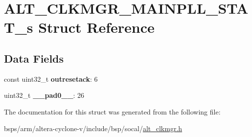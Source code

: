 \hypertarget{structALT__CLKMGR__MAINPLL__STAT__s}{}\section{A\+L\+T\+\_\+\+C\+L\+K\+M\+G\+R\+\_\+\+M\+A\+I\+N\+P\+L\+L\+\_\+\+S\+T\+A\+T\+\_\+s Struct Reference}
\label{structALT__CLKMGR__MAINPLL__STAT__s}
\subsection*{Data Fields}
\begin{DoxyCompactItemize}
\item 
\mbox{\label{structALT__CLKMGR__MAINPLL__STAT__s_a74b16db7f52521e12f6a29ea61d9e91f}} 
const uint32\+\_\+t {\bfseries outresetack}\+: 6
\item 
\mbox{\label{structALT__CLKMGR__MAINPLL__STAT__s_add95f56462ce6b303ce8cf787a5200f0}} 
uint32\+\_\+t {\bfseries \+\_\+\+\_\+pad0\+\_\+\+\_\+}\+: 26
\end{DoxyCompactItemize}


The documentation for this struct was generated from the following file\+:\begin{DoxyCompactItemize}
\item 
bsps/arm/altera-\/cyclone-\/v/include/bsp/socal/\mbox{\hyperlink{alt__clkmgr_8h}{alt\+\_\+clkmgr.\+h}}\end{DoxyCompactItemize}
